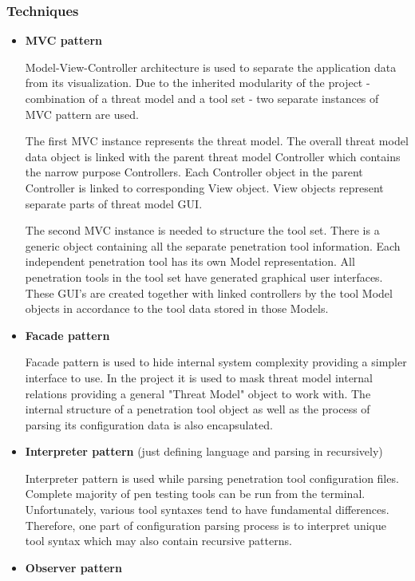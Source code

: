 \subsubsection{Techniques}
\begin{itemize}
	\item \textbf{MVC pattern}
	
	Model-View-Controller architecture is used to separate the application data from its visualization. Due to the inherited modularity of the project - combination of a threat model and a tool set - two separate instances of MVC pattern are used. 
	
	The first MVC instance represents the threat model. The overall threat model data object is linked with the parent threat model Controller which contains the narrow purpose Controllers. Each Controller object in the parent Controller is linked to corresponding View object. View objects represent separate parts of threat model GUI. 
	
	The second MVC instance is needed to structure the tool set. There is a generic object containing all the separate penetration tool information. Each independent penetration tool has its own Model representation. All penetration tools in the tool set have generated graphical user interfaces. These GUI's are created together with linked controllers by the tool Model objects in accordance to the tool data stored in those Models.
	
	\item \textbf{Facade pattern}
	
	Facade pattern is used to hide internal system complexity providing a simpler interface to use. In the project it is used to mask threat model internal relations providing a general "Threat Model" object to work with. The internal structure of a penetration tool object as well as the process of parsing its configuration data is also encapsulated.
	
	\item \textbf{Interpreter pattern} (just defining language and parsing in recursively)
	
	Interpreter pattern is used while parsing penetration tool configuration files. Complete majority of pen testing tools can be run from the terminal. Unfortunately, various tool syntaxes tend to have fundamental differences. Therefore, one part of configuration parsing process is to interpret unique tool syntax which may also contain recursive patterns.
	
	\item \textbf{Observer pattern}
	

\end{itemize}
